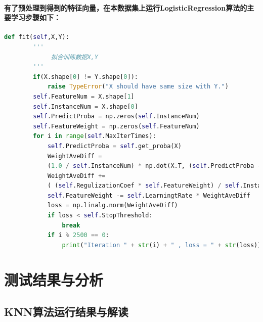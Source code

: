 \documentclass{ctexart}
\begin{document}
    \paragraph{
        有了预处理到得到的特征向量，在本数据集上运行LogisticRegression算法的主要学习步骤如下：
    }
    \begin{lstlisting}[language=python, basicstyle=\small, keywordstyle=\color{blue!100},commentstyle=\color{red!100!},frame=shadowbox, rulesepcolor=\color{red!20!green!20!blue!20}]
    def fit(self,X,Y):
        '''
             拟合训练数据X,Y
        '''
        if(X.shape[0] != Y.shape[0]):
            raise TypeError("X should have same size with Y.")
        self.FeatureNum = X.shape[1]
        self.InstanceNum = X.shape[0]
        self.PredictProba = np.zeros(self.InstanceNum)
        self.FeatureWeight = np.zeros(self.FeatureNum)
        for i in range(self.MaxIterTimes):
            self.PredictProba = self.get_proba(X)
            WeightAveDiff = 
            (1.0 / self.InstanceNum) * np.dot(X.T, (self.PredictProba - Y))
            WeightAveDiff += 
            ( (self.RegulizationCoef * self.FeatureWeight) / self.InstanceNum )
            self.FeatureWeight -= self.LearningtRate * WeightAveDiff
            loss = np.linalg.norm(WeightAveDiff)
            if loss < self.StopThreshold:
                break
            if i % 2500 == 0:
                print("Iteration " + str(i) + " , loss = " + str(loss))
        \end{lstlisting}
    \section{测试结果与分析}
    \subsection{KNN算法运行结果与解读}
\end{document}
